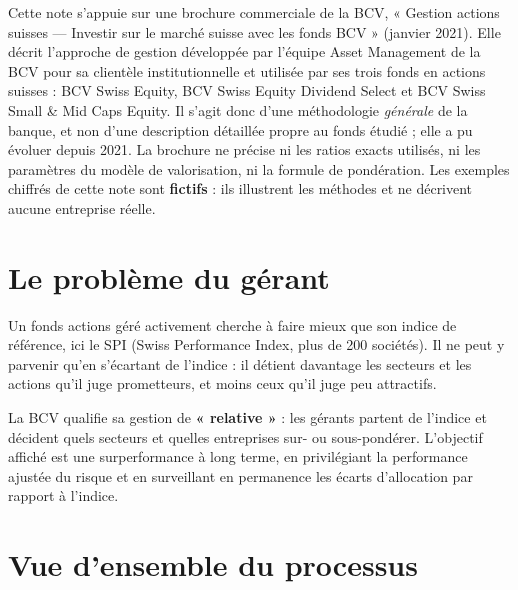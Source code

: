 \documentclass[11pt,a4paper]{article}
\begin{document}
\begin{source}\small
Cette note s'appuie sur une brochure commerciale de la BCV, « Gestion actions suisses — Investir sur le marché suisse avec les fonds BCV » (janvier 2021). Elle décrit l'approche de gestion développée par l'équipe Asset Management de la BCV pour sa clientèle institutionnelle et utilisée par ses trois fonds en actions suisses : BCV Swiss Equity, BCV Swiss Equity Dividend Select et BCV Swiss Small \& Mid Caps Equity. Il s'agit donc d'une méthodologie \emph{générale} de la banque, et non d'une description détaillée propre au fonds étudié ; elle a pu évoluer depuis 2021. La brochure ne précise ni les ratios exacts utilisés, ni les paramètres du modèle de valorisation, ni la formule de pondération. Les exemples chiffrés de cette note sont \textbf{fictifs} : ils illustrent les méthodes et ne décrivent aucune entreprise réelle.
\end{source}

\section{Le problème du gérant}

Un fonds actions géré activement cherche à faire mieux que son indice de référence, ici le SPI (Swiss Performance Index, plus de 200 sociétés). Il ne peut y parvenir qu'en s'écartant de l'indice : il détient davantage les secteurs et les actions qu'il juge prometteurs, et moins ceux qu'il juge peu attractifs.

La BCV qualifie sa gestion de \textbf{« relative »} : les gérants partent de l'indice et décident quels secteurs et quelles entreprises sur- ou sous-pondérer. L'objectif affiché est une surperformance à long terme, en privilégiant la performance ajustée du risque et en surveillant en permanence les écarts d'allocation par rapport à l'indice.

\section{Vue d'ensemble du processus}
\end{document}

